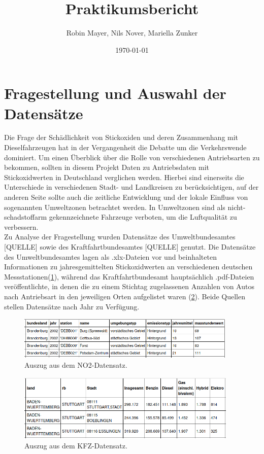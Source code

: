 \documentclass[11pt,a4paper,oneside,german]{article}
\title{Praktikumsbericht}
\author{Robin Mayer, Nils Nover, Mariella Zunker}
\date{\today}
\begin{document}
\maketitle

\newpage

\tableofcontents

\section{Fragestellung und Auswahl der Datensätze}

Die Frage der Schädlichkeit von Stickoxiden und deren Zusammenhang mit Dieselfahrzeugen hat in der Vergangenheit die Debatte um die Verkehrswende dominiert. Um einen Überblick über die Rolle von verschiedenen Antriebsarten zu bekommen, sollten in diesem Projekt Daten zu Antriebsdaten mit Stickoxidwerten in Deutschland verglichen werden. Hierbei sind einerseits die Unterschiede in verschiedenen Stadt- und Landkreisen zu berücksichtigen, auf der anderen Seite sollte auch die zeitliche Entwicklung und der lokale Einfluss von sogenannten Umweltzonen betrachtet werden. In Umweltzonen sind als nicht-schadstoffarm gekennzeichnete Fahrzeuge verboten, um die Luftqualität zu verbessern. \\
Zu Analyse der Fragestellung wurden Datensätze des Umweltbundesamtes [QUELLE] sowie des Kraftfahrtbundesamtes [QUELLE] genutzt. Die Datensätze des Umweltbundesamtes lagen als .xlx-Dateien vor und beinhalteten Informationen zu jahresgemittelten Stickoxidwerten an verschiedenen deutschen Messstationen(\ref{fig:BeispielNO2}), während das Kraftfahrtbundesamt hauptsächlich .pdf-Dateien veröffentlichte, in denen die zu einem Stichtag zugelassenen Anzahlen von Autos nach Antriebsart in den jeweiligen Orten aufgelistet waren (\ref{fig:BeispielKFZ}). Beide Quellen stellen Datensätze nach Jahr zu Verfügung.

\begin{figure}[h!]
	\centering
	\includegraphics[width=10.5cm]{BeispielNO2.png}
	\caption{Auszug aus dem NO2-Datensatz.}
	\label{fig:BeispielNO2}
\end{figure}

\begin{figure}[h!]
	\centering
	\includegraphics[width=10.5cm]{BeispielKFZ.png}
	\caption{Auszug aus dem KFZ-Datensatz.}
	\label{fig:BeispielKFZ}
\end{figure}
\end{document}
